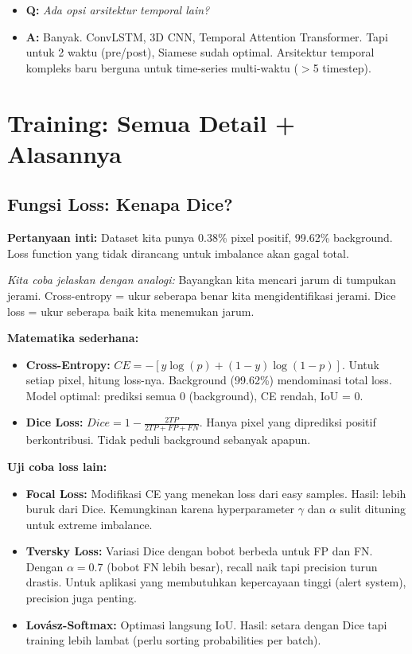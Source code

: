 \documentclass[10pt,a4paper,onecolumn]{article}
\begin{document}
\begin{itemize}
    \item{\textbf{Q:} \textit{Ada opsi arsitektur temporal lain?}}
    \item{\textbf{A:} Banyak. ConvLSTM, 3D CNN, Temporal Attention
          Transformer. Tapi untuk 2 waktu (pre/post), Siamese sudah
          optimal. Arsitektur temporal kompleks baru berguna untuk
          time-series multi-waktu ($>$5 timestep).}
\end{itemize}

\section{Training: Semua Detail + Alasannya}

\subsection{Fungsi Loss: Kenapa Dice?}

\textbf{Pertanyaan inti:} Dataset kita punya 0.38\% pixel positif,
99.62\% background. Loss function yang tidak dirancang untuk imbalance
akan gagal total.

\textit{Kita coba jelaskan dengan analogi:} Bayangkan kita mencari
jarum di tumpukan jerami. Cross-entropy = ukur seberapa benar kita
mengidentifikasi jerami. Dice loss = ukur seberapa baik kita
menemukan jarum.

\textbf{Matematika sederhana:}
\begin{itemize}[nosep]
    \item \textbf{Cross-Entropy:} $CE = -[y \log(p) + (1-y) \log(1-p)]$.
          Untuk setiap pixel, hitung loss-nya. Background (99.62\%)
          mendominasi total loss. Model optimal: prediksi semua 0
          (background), CE rendah, IoU = 0.
    \item \textbf{Dice Loss:} $Dice = 1 - \frac{2TP}{2TP+FP+FN}$.
          Hanya pixel yang diprediksi positif berkontribusi. Tidak
           peduli background sebanyak apapun.
\end{itemize}

\textbf{Uji coba loss lain:}
\begin{itemize}[nosep]
    \item \textbf{Focal Loss:} Modifikasi CE yang menekan loss dari
          easy samples. Hasil: lebih buruk dari Dice. Kemungkinan
          karena hyperparameter $\gamma$ dan $\alpha$ sulit dituning
          untuk extreme imbalance.
    \item \textbf{Tversky Loss:} Variasi Dice dengan bobot berbeda
          untuk FP dan FN. Dengan $\alpha=0.7$ (bobot FN lebih
          besar), recall naik tapi precision turun drastis. Untuk
          aplikasi yang membutuhkan kepercayaan tinggi (alert
          system), precision juga penting.
    \item \textbf{Lov\'asz-Softmax:} Optimasi langsung IoU. Hasil:
          setara dengan Dice tapi training lebih lambat (perlu
          sorting probabilities per batch).
\end{itemize}
\end{document}
